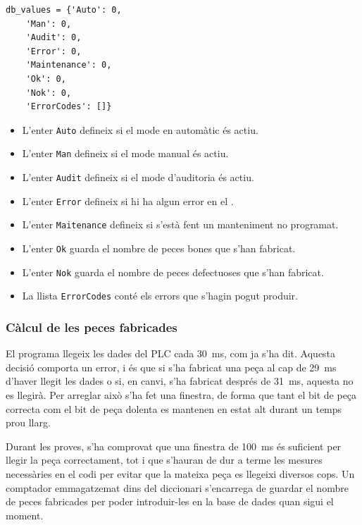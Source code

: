 \documentclass{tfgitic}[2022/06/30]
\begin{document}
\begin{lstlisting}[style=Python]
db_values = {'Auto': 0,
    'Man': 0,
    'Audit': 0,
    'Error': 0,
    'Maintenance': 0,
    'Ok': 0,
    'Nok': 0,
    'ErrorCodes': []}
\end{lstlisting}

\begin{itemize}
    \item L'enter \texttt{Auto} defineix si el mode en automàtic és actiu.
    \item L'enter \texttt{Man} defineix si el mode manual és actiu.
    \item L'enter \texttt{Audit} defineix si el mode d'auditoria és actiu.
    \item L'enter \texttt{Error} defineix si hi ha algun error en el .
    \item L'enter \texttt{Maitenance} defineix si s'està fent un manteniment no programat.
    \item L'enter \texttt{Ok} guarda el nombre de peces bones que s'han fabricat.
    \item L'enter \texttt{Nok} guarda el nombre de peces defectuoses que s'han fabricat.
    \item La llista \texttt{ErrorCodes} conté els errors que s'hagin pogut produir.
\end{itemize}

\subsubsection{Càlcul de les peces fabricades}
El programa llegeix les dades del PLC cada \SI{30}{ms}, com ja s'ha dit. Aquesta decisió comporta un error, i és que si s'ha fabricat una peça al cap de \SI{29}{ms} d'haver llegit les dades o si, en canvi, s'ha fabricat després de \SI{31}{ms}, aquesta no es llegirà. Per arreglar això s'ha fet una finestra, de forma que tant el bit de peça correcta com el bit de peça dolenta es mantenen en estat alt durant un temps prou llarg.

Durant les proves, s'ha comprovat que una finestra de \SI{100}{ms} és suficient per llegir la peça correctament, tot i que s'hauran de dur a terme les mesures necessàries en el codi per evitar que la mateixa peça es llegeixi diversos cops. Un comptador emmagatzemat dins del diccionari s'encarrega de guardar el nombre de peces fabricades per poder introduir-les en la base de dades quan sigui el moment.
\end{document}
